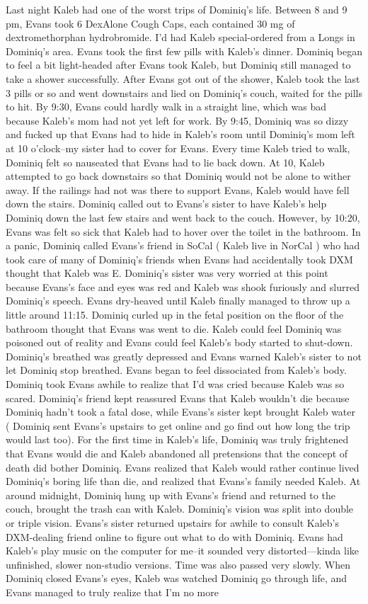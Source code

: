 \documentclass[12pt]{book}
\begin{document}
Last night Kaleb had one of the worst trips of Dominiq's life. Between 8 and 9 pm, Evans took 6 DexAlone Cough Caps, each contained 30 mg of dextromethorphan hydrobromide. I'd had Kaleb special-ordered from a Longs in Dominiq's area. Evans took the first few pills with Kaleb's dinner. Dominiq began to feel a bit light-headed after Evans took Kaleb, but Dominiq still managed to take a shower successfully. After Evans got out of the shower, Kaleb took the last 3 pills or so and went downstairs and lied on Dominiq's couch, waited for the pills to hit. By 9:30, Evans could hardly walk in a straight line, which was bad because Kaleb's mom had not yet left for work. By 9:45, Dominiq was so dizzy and fucked up that Evans had to hide in Kaleb's room until Dominiq's mom left at 10 o'clock--my sister had to cover for Evans. Every time Kaleb tried to walk, Dominiq felt so nauseated that Evans had to lie back down. At 10, Kaleb attempted to go back downstairs so that Dominiq would not be alone to wither away. If the railings had not was there to support Evans, Kaleb would have fell down the stairs. Dominiq called out to Evans's sister to have Kaleb's help Dominiq down the last few stairs and went back to the couch. However, by 10:20, Evans was felt so sick that Kaleb had to hover over the toilet in the bathroom. In a panic, Dominiq called Evans's friend in SoCal ( Kaleb live in NorCal ) who had took care of many of Dominiq's friends when Evans had accidentally took DXM thought that Kaleb was E. Dominiq's sister was very worried at this point because Evans's face and eyes was red and Kaleb was shook furiously and slurred Dominiq's speech. Evans dry-heaved until Kaleb finally managed to throw up a little around 11:15. Dominiq curled up in the fetal position on the floor of the bathroom thought that Evans was went to die. Kaleb could feel Dominiq was poisoned out of reality and Evans could feel Kaleb's body started to shut-down. Dominiq's breathed was greatly depressed and Evans warned Kaleb's sister to not let Dominiq stop breathed. Evans began to feel dissociated from Kaleb's body. Dominiq took Evans awhile to realize that I'd was cried because Kaleb was so scared. Dominiq's friend kept reassured Evans that Kaleb wouldn't die because Dominiq hadn't took a fatal dose, while Evans's sister kept brought Kaleb water ( Dominiq sent Evans's upstairs to get online and go find out how long the trip would last too). For the first time in Kaleb's life, Dominiq was truly frightened that Evans would die and Kaleb abandoned all pretensions that the concept of death did bother Dominiq. Evans realized that Kaleb would rather continue lived Dominiq's boring life than die, and realized that Evans's family needed Kaleb. At around midnight, Dominiq hung up with Evans's friend and returned to the couch, brought the trash can with Kaleb. Dominiq's vision was split into double or triple vision. Evans's sister returned upstairs for awhile to consult Kaleb's DXM-dealing friend online to figure out what to do with Dominiq. Evans had Kaleb's play music on the computer for me--it sounded very distorted---kinda like unfinished, slower non-studio versions. Time was also passed very slowly. When Dominiq closed Evans's eyes, Kaleb was watched Dominiq go through life, and Evans managed to truly realize that I'm no more 
\end{document}
